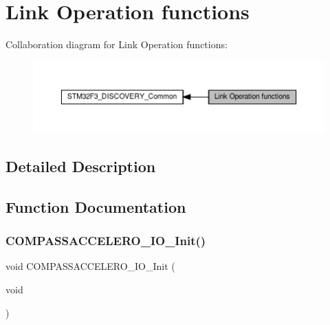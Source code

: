 \hypertarget{group__STM32F3__DISCOVERY__LINK__OPERATIONS}{}\section{Link Operation functions}
\label{group__STM32F3__DISCOVERY__LINK__OPERATIONS}
Collaboration diagram for Link Operation functions\+:\nopagebreak
\begin{figure}[H]
\begin{center}
\leavevmode
\includegraphics[width=350pt]{group__STM32F3__DISCOVERY__LINK__OPERATIONS}
\end{center}
\end{figure}


\subsection{Detailed Description}


\subsection{Function Documentation}
\mbox{\label{group__STM32F3__DISCOVERY__LINK__OPERATIONS_ga7ce9cc034e3d64924bd88adae6770d19}} 
\subsubsection{\texorpdfstring{C\+O\+M\+P\+A\+S\+S\+A\+C\+C\+E\+L\+E\+R\+O\+\_\+\+I\+O\+\_\+\+Init()}{COMPASSACCELERO\_IO\_Init()}}
{\footnotesize\ttfamily void C\+O\+M\+P\+A\+S\+S\+A\+C\+C\+E\+L\+E\+R\+O\+\_\+\+I\+O\+\_\+\+Init (\begin{DoxyParamCaption}\item[{void}]{ }\end{DoxyParamCaption})}



